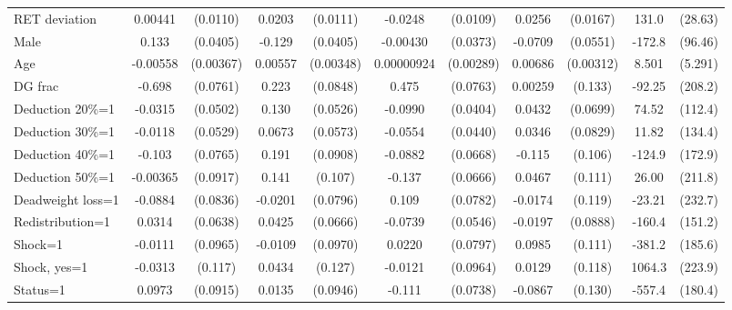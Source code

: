 \begin{tabular}{l|cccccc|cc|cc}
RET deviation   &  0.00441         & (0.0110)&   0.0203\sym{*}  & (0.0111)&  -0.0248\sym{**} & (0.0109)&   0.0256         & (0.0167)&    131.0\sym{***}&  (28.63)\\
Male            &    0.133\sym{***}& (0.0405)&   -0.129\sym{***}& (0.0405)& -0.00430         & (0.0373)&  -0.0709         & (0.0551)&   -172.8\sym{*}  &  (96.46)\\
Age             & -0.00558         &(0.00367)&  0.00557         &(0.00348)&0.00000924         &(0.00289)&  0.00686\sym{**} &(0.00312)&    8.501         &  (5.291)\\
DG frac         &   -0.698\sym{***}& (0.0761)&    0.223\sym{***}& (0.0848)&    0.475\sym{***}& (0.0763)&  0.00259         &  (0.133)&   -92.25         &  (208.2)\\
Deduction 20\%=1&  -0.0315         & (0.0502)&    0.130\sym{**} & (0.0526)&  -0.0990\sym{**} & (0.0404)&   0.0432         & (0.0699)&    74.52         &  (112.4)\\
Deduction 30\%=1&  -0.0118         & (0.0529)&   0.0673         & (0.0573)&  -0.0554         & (0.0440)&   0.0346         & (0.0829)&    11.82         &  (134.4)\\
Deduction 40\%=1&   -0.103         & (0.0765)&    0.191\sym{**} & (0.0908)&  -0.0882         & (0.0668)&   -0.115         &  (0.106)&   -124.9         &  (172.9)\\
Deduction 50\%=1& -0.00365         & (0.0917)&    0.141         &  (0.107)&   -0.137\sym{**} & (0.0666)&   0.0467         &  (0.111)&    26.00         &  (211.8)\\
Deadweight loss=1&  -0.0884         & (0.0836)&  -0.0201         & (0.0796)&    0.109         & (0.0782)&  -0.0174         &  (0.119)&   -23.21         &  (232.7)\\
Redistribution=1&   0.0314         & (0.0638)&   0.0425         & (0.0666)&  -0.0739         & (0.0546)&  -0.0197         & (0.0888)&   -160.4         &  (151.2)\\
Shock=1         &  -0.0111         & (0.0965)&  -0.0109         & (0.0970)&   0.0220         & (0.0797)&   0.0985         &  (0.111)&   -381.2\sym{**} &  (185.6)\\
Shock, yes=1    &  -0.0313         &  (0.117)&   0.0434         &  (0.127)&  -0.0121         & (0.0964)&   0.0129         &  (0.118)&   1064.3\sym{***}&  (223.9)\\
Status=1        &   0.0973         & (0.0915)&   0.0135         & (0.0946)&   -0.111         & (0.0738)&  -0.0867         &  (0.130)&   -557.4\sym{***}&  (180.4)\\

\end{tabular}
